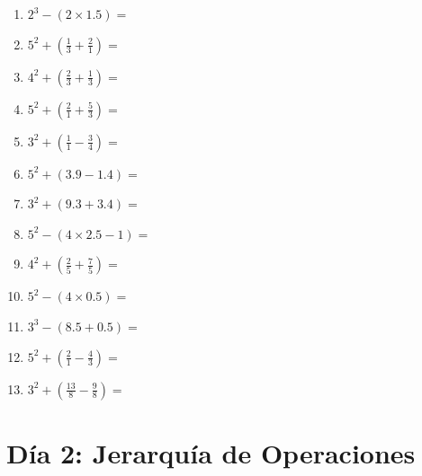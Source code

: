 \documentclass[12pt]{article}
\begin{document}
\begin{enumerate}
\item \large $ 2^{3} - (2 \times 1.5) = $ \vspace{1.4cm}
\newpage
\item \large $ 5^{2} + (\frac{1}{3} + \frac{2}{1}) = $ \vspace{1.4cm}
\item \large $ 4^{2} + (\frac{2}{3} + \frac{1}{3}) = $ \vspace{1.4cm}
\item \large $ 5^{2} + (\frac{2}{1} + \frac{5}{3}) = $ \vspace{1.4cm}
\item \large $ 3^{2} + (\frac{1}{1} - \frac{3}{4}) = $ \vspace{1.4cm}
\item \large $ 5^{2} + (3.9 - 1.4) = $ \vspace{1.4cm}
\item \large $ 3^{2} + (9.3 + 3.4) = $ \vspace{1.4cm}
\item \large $ 5^{2} - (4 \times 2.5 - 1) = $ \vspace{1.4cm}
\item \large $ 4^{2} + (\frac{2}{5} + \frac{7}{5}) = $ \vspace{1.4cm}
\item \large $ 5^{2} - (4 \times 0.5) = $ \vspace{1.4cm}
\item \large $ 3^{3} - (8.5 + 0.5) = $ \vspace{1.4cm}
\newpage
\item \large $ 5^{2} + (\frac{2}{1} - \frac{4}{3}) = $ \vspace{1.4cm}
\item \large $ 3^{2} + (\frac{13}{8} - \frac{9}{8}) = $ \vspace{1.4cm}
\end{enumerate}
\newpage
\section*{Día 2: Jerarquía de Operaciones}
\end{document}
